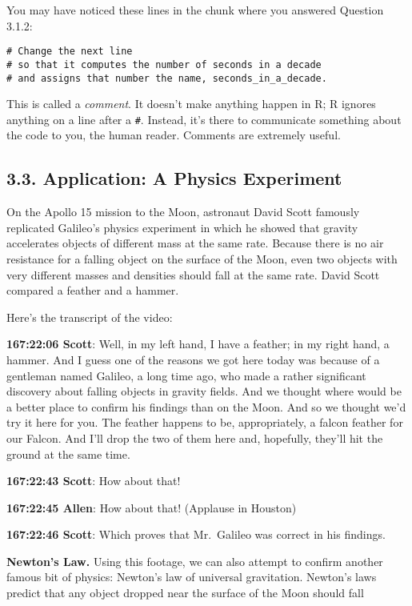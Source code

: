 \documentclass[
]{article}
\begin{document}
You may have noticed these lines in the chunk where you answered
Question 3.1.2:

\begin{verbatim}
# Change the next line 
# so that it computes the number of seconds in a decade 
# and assigns that number the name, seconds_in_a_decade.
\end{verbatim}

This is called a \emph{comment}. It doesn't make anything happen in R; R
ignores anything on a line after a \texttt{\#}. Instead, it's there to
communicate something about the code to you, the human reader. Comments
are extremely useful.

\subsection{3.3. Application: A Physics
Experiment}\label{application-a-physics-experiment}

On the Apollo 15 mission to the Moon, astronaut David Scott famously
replicated Galileo's physics experiment in which he showed that gravity
accelerates objects of different mass at the same rate. Because there is
no air resistance for a falling object on the surface of the Moon, even
two objects with very different masses and densities should fall at the
same rate. David Scott compared a feather and a hammer.

Here's the transcript of the video:

\textbf{167:22:06 Scott}: Well, in my left hand, I have a feather; in my
right hand, a hammer. And I guess one of the reasons we got here today
was because of a gentleman named Galileo, a long time ago, who made a
rather significant discovery about falling objects in gravity fields.
And we thought where would be a better place to confirm his findings
than on the Moon. And so we thought we'd try it here for you. The
feather happens to be, appropriately, a falcon feather for our Falcon.
And I'll drop the two of them here and, hopefully, they'll hit the
ground at the same time.

\textbf{167:22:43 Scott}: How about that!

\textbf{167:22:45 Allen}: How about that! (Applause in Houston)

\textbf{167:22:46 Scott}: Which proves that Mr.~Galileo was correct in
his findings.

\textbf{Newton's Law.} Using this footage, we can also attempt to
confirm another famous bit of physics: Newton's law of universal
gravitation. Newton's laws predict that any object dropped near the
surface of the Moon should fall
\end{document}
